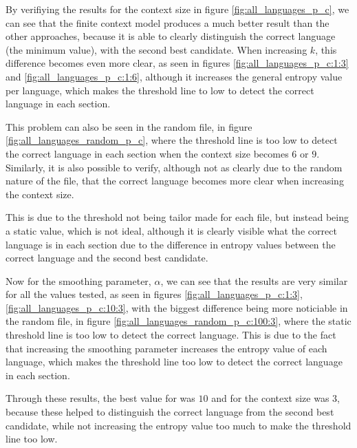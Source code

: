 \documentclass{article}
\begin{document}
By verifiying the results for the context size in figure \ref{fig:all_languages_p_c}, we can see that the finite context model produces a much better result than the other approaches,
because it is able to clearly distinguish the correct language (the minimum value), with the second best candidate.
When increasing $k$, this difference becomes even more clear, as seen in figures \ref{fig:all_languages_p_c:1:3} and \ref{fig:all_languages_p_c:1:6},
although it increases the general entropy value per language, which makes the threshold line to low to detect the correct language in each section.

This problem can also be seen in the random file, in figure \ref{fig:all_languages_random_p_c}, where the threshold line is too low to detect the correct language in each section when the context size
becomes $6$ or $9$.
Similarly, it is also possible to verify, although not as clearly due to the random nature of the file, that the correct language becomes more clear when increasing the context size.

This is due to the threshold not being tailor made for each file, but instead being a static value, which is not ideal, although it is clearly visible what the correct language is
in each section due to the difference in entropy values between the correct language and the second best candidate.

Now for the smoothing parameter, $\alpha$, we can see that the results are very similar for all the values tested, as seen in figures \ref{fig:all_languages_p_c:1:3}, \ref{fig:all_languages_p_c:10:3},
with the biggest difference being more noticiable in the random file, in figure \ref{fig:all_languages_random_p_c:100:3}, where the static threshold line is too low to detect the correct language.
This is due to the fact that increasing the smoothing parameter increases the entropy value of each language, which makes the threshold line too low to detect the correct language in each section.

Through these results, the best value for \alpha was $10$ and for the context size was $3$, because these helped to distinguish the correct language from the second best candidate, while not increasing the entropy value too much to make the threshold line too low.
\end{document}
